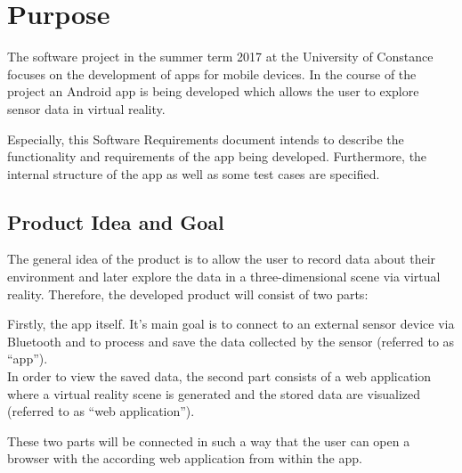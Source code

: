 \section{Purpose}

The software project in the summer term 2017 at the University of Constance focuses on the development of apps for mobile devices. In the course of the project an Android app is being developed which allows the user to explore sensor data in virtual reality.

Especially, this Software Requirements document intends to describe the functionality and requirements of the app being developed. Furthermore, the internal structure of the app as well as some test cases are specified.

\subsection{Product Idea and Goal}

The general idea of the product is to allow the user to record data about their environment and later explore the data in a three-dimensional scene via virtual reality. Therefore, the developed product will consist of two parts:

Firstly, the app itself. It's main goal is to connect to an external sensor device via Bluetooth and to process and save the data collected by the sensor (referred to as ``app''). \\
In order to view the saved data, the second part consists of a web application where a virtual reality scene is generated and the stored data are visualized (referred to as ``web application''). 

These two parts will be connected in such a way that the user can open a browser with the according web application from within the app.





